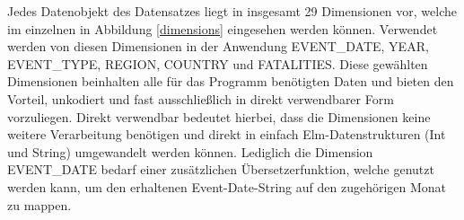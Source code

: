 \documentclass[usegeometry=true]{scrartcl}
\begin{document}
Jedes Datenobjekt des Datensatzes liegt in insgesamt 29 Dimensionen vor, welche im einzelnen in Abbildung \ref{dimensions} eingesehen werden können. Verwendet werden von diesen Dimensionen in der Anwendung EVENT\_DATE, YEAR, EVENT\_TYPE, REGION, COUNTRY und FATALITIES. Diese gewählten Dimensionen beinhalten alle für das Programm benötigten Daten und bieten den Vorteil, unkodiert und fast ausschließlich in direkt verwendbarer Form vorzuliegen. Direkt verwendbar bedeutet hierbei, dass die Dimensionen keine weitere Verarbeitung benötigen und direkt in einfach Elm-Datenstrukturen (Int und String) umgewandelt werden können. Lediglich die Dimension EVENT\_DATE bedarf einer zusätzlichen Übersetzerfunktion, welche genutzt werden kann, um den erhaltenen Event-Date-String auf den zugehörigen Monat zu mappen.\\
\end{document}
